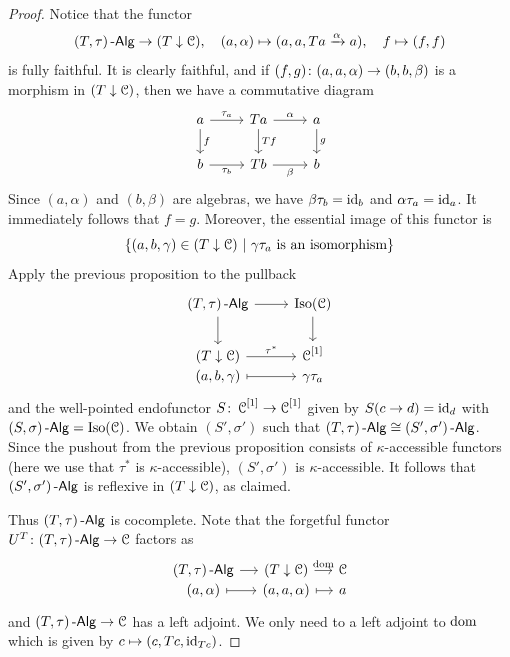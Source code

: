 \documentclass[a4paper,11pt,oneside,openany]{scrbook}
\begin{document}
\begin{proof}
	Notice that the functor
	\begin{displaymath}
		(T,\tau)\operatorname{-\mathsf{Alg}} \to (T \downarrow \operatorname{\mathcal{C}}), \quad (a,\alpha) \mapsto (a,a,Ta \xrightarrow{\alpha} a), \quad f \mapsto (f,f)
	\end{displaymath}
	is fully faithful.
	It is clearly faithful, and if $ (f,g)\colon (a,a,\alpha) \to (b,b,\beta) $
	is a morphism in $ (T \downarrow \operatorname{\mathcal{C}}) $, then we have a commutative diagram
	\begin{displaymath}
		\begin{tikzcd}
			a \arrow[d,"f"]\arrow[r, "\tau_a"]& Ta \arrow[d, "Tf"] \arrow[r, "\alpha"] & a\arrow[d, "g"]\\
			b\arrow[r,"\tau_b"'] & Tb \arrow[r, "\beta"']& b
		\end{tikzcd}
	\end{displaymath}
	Since $ (a,\alpha) $ and $ (b,\beta) $ are algebras, we have $ \beta\tau_b = \operatorname{id}_b $ and $ \alpha \tau_a = \operatorname{id}_a $.
	It immediately follows that $ f = g $.
	Moreover, the essential image of this functor is
	\begin{displaymath}
		\{(a,b,\gamma)\in (T\downarrow\C)\ |\ \gamma\tau_a \text{ is an isomorphism}\}
	\end{displaymath}
	Apply the previous proposition to the pullback
	\begin{displaymath}
		\begin{tikzcd}
			(T,\tau)\Alg \arrow[d]\arrow[r] & \operatorname{Iso}(\C) \arrow[d]\\
			(T\downarrow\C) \arrow[r, "\tau^*"] & \C^{[1]}\\[-2.1em]
			(a,b,\gamma)\arrow[r, mapsto] & \gamma\tau_a
		\end{tikzcd}
	\end{displaymath}
	and the well-pointed endofunctor $ S\colon \operatorname{\mathcal{C}}^{[1]} \to \operatorname{\mathcal{C}}^{[1]} $ given by $ S(c\to d) = \operatorname{id}_{d} $ with $ (S,\sigma)\operatorname{-\mathsf{Alg}} = \operatorname{Iso}(\operatorname{\mathcal{C}}) $.
	We obtain $ (S',\sigma') $ such that $ (T,\tau)\operatorname{-\mathsf{Alg}} \cong (S',\sigma')\operatorname{-\mathsf{Alg}} $.
	Since the pushout from the previous proposition consists of $ \kappa $-accessible functors (here we use that $ \tau^* $ is $ \kappa $-accessible), $ (S',\sigma') $ is $ \kappa $-accessible.
	It follows that $ (S',\sigma')\operatorname{-\mathsf{Alg}} $ is reflexive in $ (T\downarrow\operatorname{\mathcal{C}}) $, as claimed.

	Thus $ (T,\tau)\operatorname{-\mathsf{Alg}} $ is cocomplete.
	Note that the forgetful functor $ U^T \colon (T,\tau)\operatorname{-\mathsf{Alg}} \to \operatorname{\mathcal{C}} $ factors as
	\begin{displaymath}
		\begin{tikzcd}[column sep = small]
			(T,\tau)\Alg \arrow[r]& (T\downarrow\C)\arrow[r,"\text{dom}"] & \C  \\[-2.1em]
			(a,\alpha) \arrow[r,mapsto] & (a,a,\alpha) \arrow[r,mapsto] & a
		\end{tikzcd}
	\end{displaymath}
	and $ (T,\tau)\operatorname{-\mathsf{Alg}} \to \operatorname{\mathcal{C}} $ has a left adjoint.
	We only need to a left adjoint to $ \operatorname{dom} $ which is given by $ c \mapsto (c,Tc, \operatorname{id}_{Tc}) $.
\end{proof}
\end{document}
